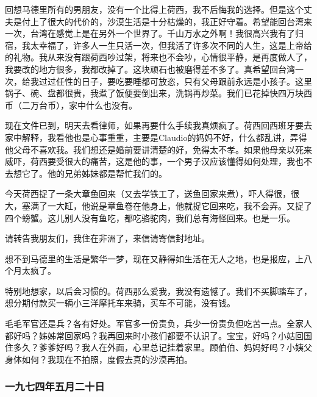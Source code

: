 \par 回想马德里所有的男朋友，没有一个比得上荷西，我不后悔我的选择。但是这个丈夫是付上了很大的代价的，沙漠生活是十分枯燥的，我正好守着。希望能回台湾来一次，台湾在感觉上是在另外一个世界了。千山万水之外啊！我很高兴我有了归宿，我太幸福了，许多人一生只活一次，但我活了许多次不同的人生，这是上帝给的礼物。我从来没有跟荷西吵过架，将来也不会吵，心情很平静，是再度做人了，我要改的地方很多，我都改掉了。这块顽石也被磨得差不多了。真希望回台湾一次，给我过过任性的日子，要吃要睡都可放恣，只有父母跟前永远是小孩子。这里锅子、碗、盘都很贵，我煮了饭便要倒出来，洗锅再炒菜。我们已花掉快四万块西币（二万台币），家中什么也没有。
\par 现在文件已到，明天去看律师，如果再要什么手续我真烦疯了。荷西回西班牙要去家中解释，我看他也是心事重重，主要是Claudio的妈妈不好，什么都乱讲，弄得他父母不喜欢我。我们想还是婚前要讲清楚的好，免得太不孝。如果他母亲以死来威吓，荷西要受很大的痛苦，这是他的事，一个男子汉应该懂得如何处理，我也不去想它了。他的兄弟姊妹都是帮忙我们的。
\par 今天荷西捉了一条大章鱼回来（又去学铁工了，送鱼回家来煮），吓人得很，很大，塞满了一大缸，他说是章鱼卷在他身上，他就捉它回来吃，我不会弄。又捉了四个螃蟹。这儿别人没有鱼吃，都吃骆驼肉，我们总有海怪回来。也是一乐。
\par 请转告我朋友们，我住在非洲了，来信请寄信封地址。
\par 想不到马德里的生活是繁华一梦，现在又静得如生活在无人之地，也是报应，上八个月太疯了。
\par 特别地想家，以后会习惯的。荷西那么爱我，我没有遗憾了。我们不买脚踏车了，想分期付款买一辆小三洋摩托车来骑，买车不可能，没有钱。
\par 毛毛军官还是兵？各有好处。军官多一份责负，兵少一份责负但吃苦一点。全家人都好吗？姊姊常回家吗？我再回来时小孩们都要不认识了。宝宝，好吗？小姑回国住多久？爹爹好吗？我人在外面，心里总记挂着家里。顾伯伯、妈妈好吗？小姨父身体如何？我现在不拍照，度假去真的沙漠再拍。
\par {}

\subsubsection{一九七四年五月二十日}

